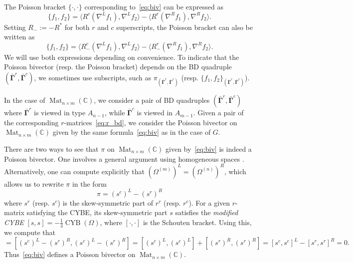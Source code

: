 \documentclass[11pt]{article}
\newcommand{\bbg}{\bar{\mathbf{\Gamma}}}
\DeclareMathOperator{\Mat}{Mat}
\DeclareMathOperator{\CYB}{CYB}
\theoremstyle{definition}\newtheorem{definition}[theorem]{Definition}
\theoremstyle{definition}\newtheorem{remark}[theorem]{Remark}
\theoremstyle{remark}
\numberwithin{equation}{section}
\begin{document}
The Poisson bracket $\{\cdot,\cdot\}$ corresponding to~\eqref{eq:biv} can be expressed as
\begin{equation*}
    \{f_1,f_2\} = \langle R^c(\nabla^L f_1),\nabla^L f_2\rangle - \langle R^r(\nabla^R f_1),\nabla^R f_2\rangle.
\end{equation*}
Setting $R_- := -R^*$ for both $r$ and $c$ superscripts, the Poisson bracket can also be written as
\begin{equation*}
    \{f_1,f_2\} = \langle R^c_-(\nabla^L f_1),\nabla^L f_2\rangle - \langle R^r_-(\nabla^R f_1),\nabla^R f_2\rangle.
\end{equation*}
We will use both expressions depending on convenience. To indicate that the Poisson bivector (resp. the Poisson bracket) depends on the BD quadruple $(\bbg^r,\bbg^c)$, we sometimes use subscripts, such as $\pi_{(\bbg^r,\bbg^c)}$ (resp. $\{f_1,f_2\}_{(\bbg^r,\bbg^c)}$).

In the case of $\Mat_{n\times m}(\mathbb{C})$, we consider a pair of BD quadruples $(\bbg^r,\bbg^c)$ where $\bbg^r$ is viewed in type $A_{n-1}$, while $\bbg^c$ is viewed in $A_{m-1}$. Given a pair of the corresponding $r$-matrices~\eqref{eq:r_bd}, we consider the Poisson bivector on $\Mat_{n\times m}(\mathbb{C})$ given by the same formula~\eqref{eq:biv} as in the case of $G$. 

There are two ways to see that $\pi$ on $\Mat_{n\times m}(\mathbb{C})$ given by~\eqref{eq:biv} is indeed a Poisson bivector. One involves a general argument using homogeneous spaces \cite[Proposition 4.2]{gy-homog}. Alternatively, one can compute explicitly that $(\Omega^{(m)})^L = (\Omega^{(n)})^R$, which allows us to rewrite $\pi$ in the form
\begin{equation*}
    \pi = (s^c)^L - (s^r)^R
\end{equation*}
where $s^r$ (resp. $s^c$) is the skew-symmetric part of $r^r$ (resp. $r^c$). For a given $r$-matrix satisfying the CYBE, its skew-symmetric part $s$ satisfies the \emph{modified CYBE} $[s,s] = -\frac{1}{3}\CYB(\Omega)$, where $[\cdot,\cdot]$ is the Schouten bracket. Using this, we compute that
\begin{equation*}
    [\pi,\pi] = [(s^c)^L - (s^r)^R,(s^c)^L - (s^r)^R]=  [(s^c)^L,(s^c)^L] + [(s^r)^R,(s^r)^R] = [s^c,s^c]^L - [s^r,s^r]^R = 0.
\end{equation*}
Thus~\eqref{eq:biv} defines a Poisson bivector on $\Mat_{n\times m}(\mathbb{C})$.
\end{document}
